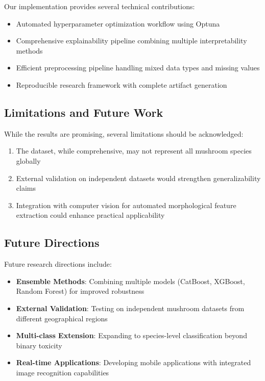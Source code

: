 \documentclass[11pt,a4paper]{article}
\begin{document}
Our implementation provides several technical contributions:
\begin{itemize}
    \item Automated hyperparameter optimization workflow using Optuna
    \item Comprehensive explainability pipeline combining multiple interpretability methods
    \item Efficient preprocessing pipeline handling mixed data types and missing values
    \item Reproducible research framework with complete artifact generation
\end{itemize}

\subsection{Limitations and Future Work}

While the results are promising, several limitations should be acknowledged:

\begin{enumerate}
    \item The dataset, while comprehensive, may not represent all mushroom species globally
    \item External validation on independent datasets would strengthen generalizability claims
    \item Integration with computer vision for automated morphological feature extraction could enhance practical applicability
\end{enumerate}

\subsection{Future Directions}

Future research directions include:
\begin{itemize}
    \item \textbf{Ensemble Methods}: Combining multiple models (CatBoost, XGBoost, Random Forest) for improved robustness
    \item \textbf{External Validation}: Testing on independent mushroom datasets from different geographical regions
    \item \textbf{Multi-class Extension}: Expanding to species-level classification beyond binary toxicity
    \item \textbf{Real-time Applications}: Developing mobile applications with integrated image recognition capabilities
\end{itemize}
\end{document}
